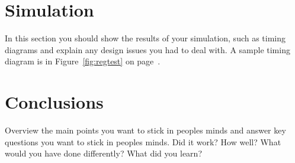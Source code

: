\documentclass{article}
\begin{document}
\section{Simulation}
In this section you should show the results of your simulation, such as timing diagrams and explain any design issues you had to deal with.  A sample timing diagram is in Figure~\ref{fig:regtest} on page~\pageref{fig:regtest}.

\begin{figure}
\begin{center}
\end{center}
\end{figure}

\section{Conclusions}
Overview the main points you want to stick in peoples minds and answer key questions you want to stick in peoples minds.  Did it work?  How well? What would you have done differently?  What did you learn?
\end{document}
